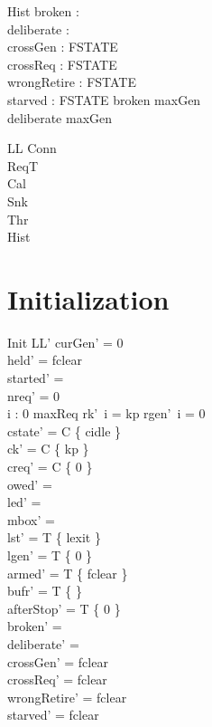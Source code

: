 \documentclass[a4paper,10pt,fleqn]{article}
\begin{document}
\begin{schema}{Hist}
  broken : \power \nat \\
  deliberate : \power \nat \\
  crossGen : FSTATE \\
  crossReq : FSTATE \\
  wrongRetire : FSTATE \\
  starved : FSTATE
\where
  broken  \upto maxGen \\
  deliberate  \upto maxGen
\end{schema}

\begin{schema}{LL}
  Conn \\
  ReqT \\
  Cal \\
  Snk \\
  Thr \\
  Hist
\end{schema}

\section{Initialization}

\begin{schema}{Init}
  LL'
\where
  curGen' = 0 \\
  held' = fclear \\
  started' = \emptyset \\
  nreq' = 0 \\
  \forall i : 0 \upto maxReq \spot rk'~i = kp \land rgen'~i = 0 \\
  cstate' = C \cross \{ cidle \} \\
  ck' = C \cross \{ kp \} \\
  creq' = C \cross \{ 0 \} \\
  owed' = \emptyset \\
  led' = \emptyset \\
  mbox' = \emptyset \\
  lst' = T \cross \{ lexit \} \\
  lgen' = T \cross \{ 0 \} \\
  armed' = T \cross \{ fclear \} \\
  bufr' = T \cross \{ \emptyset \} \\
  afterStop' = T \cross \{ 0 \} \\
  broken' = \emptyset \\
  deliberate' = \emptyset \\
  crossGen' = fclear \\
  crossReq' = fclear \\
  wrongRetire' = fclear \\
  starved' = fclear
\end{schema}
\end{document}
